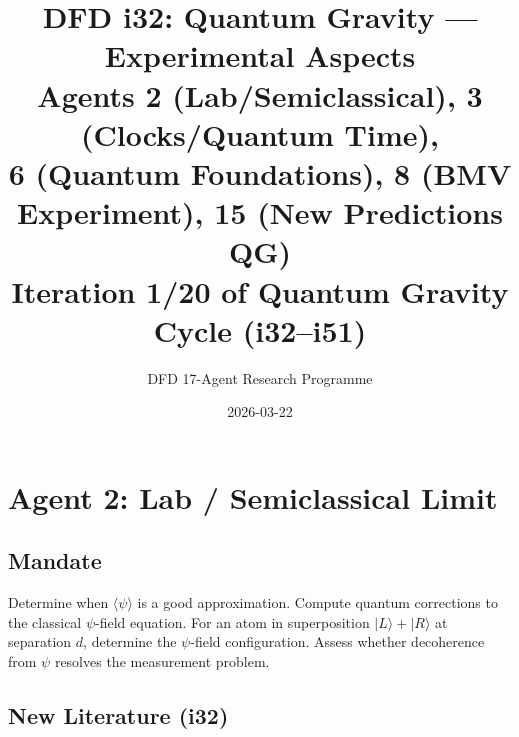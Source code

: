 \documentclass[11pt,a4paper]{article}
\title{DFD i32: Quantum Gravity --- Experimental Aspects\\[6pt]
\large Agents 2 (Lab/Semiclassical), 3 (Clocks/Quantum Time),\\
6 (Quantum Foundations), 8 (BMV Experiment), 15 (New Predictions QG)\\[6pt]
\normalsize Iteration 1/20 of Quantum Gravity Cycle (i32--i51)}
\author{DFD 17-Agent Research Programme}
\date{2026-03-22}
\begin{document}
\maketitle
\tableofcontents
\newpage

\section{Agent 2: Lab / Semiclassical Limit}
\label{sec:agent2}

\subsection{Mandate}

Determine when $\langle\psi\rangle$ is a good approximation. Compute quantum corrections to the classical $\psi$-field equation. For an atom in superposition $|L\rangle + |R\rangle$ at separation $d$, determine the $\psi$-field configuration. Assess whether decoherence from $\psi$ resolves the measurement problem.

\subsection{New Literature (i32)}
\end{document}
